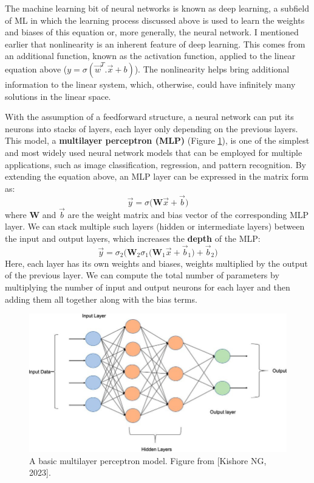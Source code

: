 The machine learning bit of neural networks is known as deep learning, a subfield of ML in which the learning process discussed above is used to learn the weights and biases of this equation or, more generally, the neural network. I mentioned earlier that nonlinearity is an inherent feature of deep learning. This comes from an additional function, known as the activation function, applied to the linear equation above ($y = \sigma(\vec{w} ^T. \vec{x} + b)$). The nonlinearity helps bring additional information to the linear system, which, otherwise, could have infinitely many solutions in the linear space.


With the assumption of a feedforward structure, a neural network can put its neurons into stacks of layers, each layer only depending on the previous layers. This model, a \textbf{multilayer perceptron (MLP)} (Figure \ref{fig:mlp}), is one of the simplest and most widely used neural network models that can be employed for multiple applications, such as image classification, regression, and pattern recognition. By extending the equation above, an MLP layer can be expressed in the matrix form as:
\begin{equation}
\vec{y} = \sigma \biggl(\mathbf{W}\vec{x} + \vec{b} \biggr)
\end{equation}
where $\mathbf{W}$ and $\vec{b}$ are the weight matrix and bias vector of the corresponding MLP layer. We can stack multiple such layers (hidden or intermediate layers) between the input and output layers, which increases the \textbf{depth} of the MLP:
\begin{equation}
\vec{y} = \sigma_2 \biggl( \mathbf{W}_2\sigma_1 \biggl(\mathbf{W}_1\vec{x} + \vec{b}_1 \biggr) + \vec{b}_2\biggr) 
\end{equation}
Here, each layer has its own weights and biases, weights multiplied by the output of the previous layer. We can compute the total number of parameters by multiplying the number of input and output neurons for each layer and then adding them all together along with the bias terms. 



\begin{figure}[ht]
  \centering
   \includegraphics[width=0.8\linewidth]{Images/MLP.jpeg}
   \caption{A basic multilayer perceptron model. Figure from [Kishore NG, 2023].}
   \label{fig:mlp}
\end{figure}

